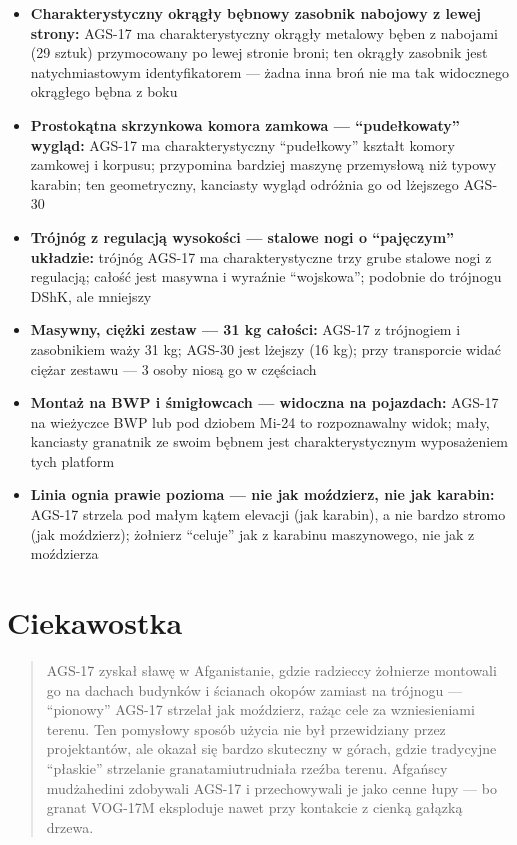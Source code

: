 \documentclass[12pt,openany,oneside]{book}
\providecommand{\tightlist}{%
  \setlength{\itemsep}{0pt}\setlength{\parskip}{0pt}}
\begin{document}
\begin{itemize}
\tightlist
\item
  \textbf{Charakterystyczny okrągły bębnowy zasobnik nabojowy z lewej
  strony:} AGS-17 ma charakterystyczny okrągły metalowy bęben z nabojami
  (29 sztuk) przymocowany po lewej stronie broni; ten okrągły zasobnik
  jest natychmiastowym identyfikatorem --- żadna inna broń nie ma tak
  widocznego okrągłego bębna z boku
\item
  \textbf{Prostokątna skrzynkowa komora zamkowa --- ``pudełkowaty''
  wygląd:} AGS-17 ma charakterystyczny ``pudełkowy'' kształt komory
  zamkowej i korpusu; przypomina bardziej maszynę przemysłową niż typowy
  karabin; ten geometryczny, kanciasty wygląd odróżnia go od lżejszego
  AGS-30
\item
  \textbf{Trójnóg z regulacją wysokości --- stalowe nogi o ``pajęczym''
  układzie:} trójnóg AGS-17 ma charakterystyczne trzy grube stalowe nogi
  z regulacją; całość jest masywna i wyraźnie ``wojskowa''; podobnie do
  trójnogu DShK, ale mniejszy
\item
  \textbf{Masywny, ciężki zestaw --- 31 kg całości:} AGS-17 z trójnogiem
  i zasobnikiem waży 31 kg; AGS-30 jest lżejszy (16 kg); przy
  transporcie widać ciężar zestawu --- 3 osoby niosą go w częściach
\item
  \textbf{Montaż na BWP i śmigłowcach --- widoczna na pojazdach:} AGS-17
  na wieżyczce BWP lub pod dziobem Mi-24 to rozpoznawalny widok; mały,
  kanciasty granatnik ze swoim bębnem jest charakterystycznym
  wyposażeniem tych platform
\item
  \textbf{Linia ognia prawie pozioma --- nie jak moździerz, nie jak
  karabin:} AGS-17 strzela pod małym kątem elevacji (jak karabin), a nie
  bardzo stromo (jak moździerz); żołnierz ``celuje'' jak z karabinu
  maszynowego, nie jak z moździerza
\end{itemize}

\section{Ciekawostka}\label{ciekawostka-82}

\begin{quote}
AGS-17 zyskał sławę w Afganistanie, gdzie radzieccy żołnierze montowali
go na dachach budynków i ścianach okopów zamiast na trójnogu ---
``pionowy'' AGS-17 strzelał jak moździerz, rażąc cele za wzniesieniami
terenu. Ten pomysłowy sposób użycia nie był przewidziany przez
projektantów, ale okazał się bardzo skuteczny w górach, gdzie tradycyjne
``płaskie'' strzelanie granatamiutrudniała rzeźba terenu. Afgańscy
mudżahedini zdobywali AGS-17 i przechowywali je jako cenne łupy --- bo
granat VOG-17M eksploduje nawet przy kontakcie z cienką gałązką drzewa.
\end{quote}
\end{document}
